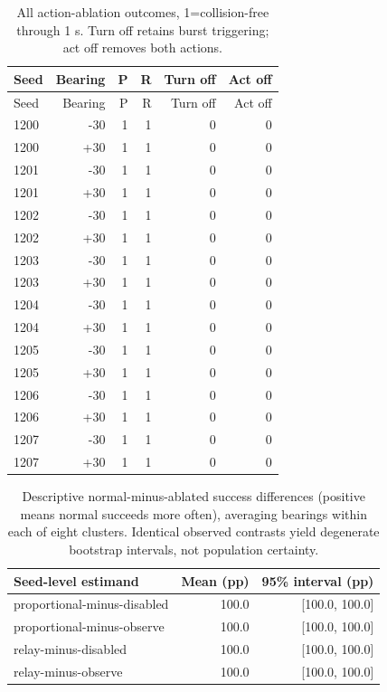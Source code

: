 \documentclass[10pt,letterpaper]{article}
\begin{document}
{\small
\begin{longtable}{lrrrrr}
\caption{All action-ablation outcomes, 1=collision-free through 1 s. Turn off retains burst triggering; act off removes both actions.}\\
\toprule
Seed & Bearing & P & R & Turn off & Act off\\
\midrule\endfirsthead
\toprule
Seed & Bearing & P & R & Turn off & Act off\\
\midrule\endhead
1200 & -30 & 1 & 1 & 0 & 0\\
1200 & +30 & 1 & 1 & 0 & 0\\
1201 & -30 & 1 & 1 & 0 & 0\\
1201 & +30 & 1 & 1 & 0 & 0\\
1202 & -30 & 1 & 1 & 0 & 0\\
1202 & +30 & 1 & 1 & 0 & 0\\
1203 & -30 & 1 & 1 & 0 & 0\\
1203 & +30 & 1 & 1 & 0 & 0\\
1204 & -30 & 1 & 1 & 0 & 0\\
1204 & +30 & 1 & 1 & 0 & 0\\
1205 & -30 & 1 & 1 & 0 & 0\\
1205 & +30 & 1 & 1 & 0 & 0\\
1206 & -30 & 1 & 1 & 0 & 0\\
1206 & +30 & 1 & 1 & 0 & 0\\
1207 & -30 & 1 & 1 & 0 & 0\\
1207 & +30 & 1 & 1 & 0 & 0\\
\bottomrule
\end{longtable}
}

\begin{table}[H]
\centering\small
\caption{Descriptive normal-minus-ablated success differences (positive means normal succeeds more often), averaging bearings within each of eight clusters. Identical observed contrasts yield degenerate bootstrap intervals, not population certainty.}
\begin{tabular}{lrr}
\toprule
Seed-level estimand & Mean (pp) & 95\% interval (pp)\\
\midrule
proportional-minus-disabled & 100.0 & [100.0, 100.0]\\
proportional-minus-observe & 100.0 & [100.0, 100.0]\\
relay-minus-disabled & 100.0 & [100.0, 100.0]\\
relay-minus-observe & 100.0 & [100.0, 100.0]\\
\bottomrule
\end{tabular}
\end{table}
\end{document}
